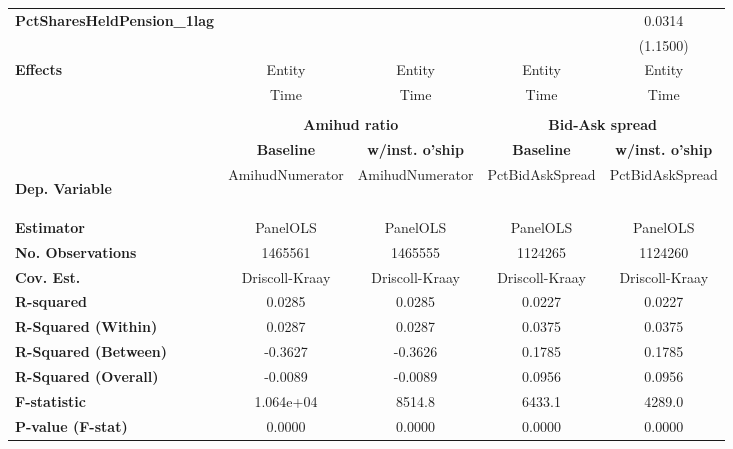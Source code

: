 {\begin{longtable}{>{\bfseries}lcccc}
\textbf{PctSharesHeldPension\_1lag}        &                     &                                &                     &              0.0314              \\
\textbf{ }                                 &                     &                                &                     &             (1.1500)             \\
\midrule
\textbf{Effects}                           &        Entity       &             Entity             &        Entity       &              Entity              \\
& Time & Time & Time & Time\\
\bottomrule
\bigskip\\
\toprule
& \multicolumn{2}{c}{\textbf{Amihud ratio}} &  \multicolumn{2}{c}{\textbf{Bid-Ask spread}}\\
\midrule
&   \textbf{Baseline}   & \textbf{w/inst. o'ship} &   \textbf{Baseline}  & \textbf{w/inst. o'ship}  \\
\midrule

\textbf{Dep. Variable}                     &   AmihudNumerator   &        AmihudNumerator         &   PctBidAskSpread   &         PctBidAskSpread          \\
\textbf{Estimator}                         &       PanelOLS      &            PanelOLS            &       PanelOLS      &             PanelOLS             \\
\textbf{No. Observations}                  &       1465561       &            1465555             &       1124265       &             1124260              \\
\textbf{Cov. Est.}                         &    Driscoll-Kraay   &         Driscoll-Kraay         &    Driscoll-Kraay   &          Driscoll-Kraay          \\
\textbf{R-squared}                         &        0.0285       &             0.0285             &        0.0227       &              0.0227              \\
\textbf{R-Squared (Within)}                &        0.0287       &             0.0287             &        0.0375       &              0.0375              \\
\textbf{R-Squared (Between)}               &       -0.3627       &            -0.3626             &        0.1785       &              0.1785              \\
\textbf{R-Squared (Overall)}               &       -0.0089       &            -0.0089             &        0.0956       &              0.0956              \\
\textbf{F-statistic}                       &      1.064e+04      &             8514.8             &        6433.1       &              4289.0              \\
\textbf{P-value (F-stat)}                  &        0.0000       &             0.0000             &        0.0000       &              0.0000              \\
\bottomrule
\end{longtable}
}
